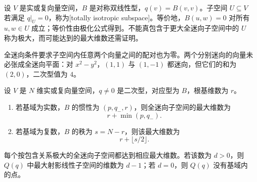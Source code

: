 \begin{definition}
	\label{g1:def:totally-isotropic}
	设 \(V\) 是实或复向量空间，\(B\) 是对称双线性型，\(q(v)=B(v,v)\)。子空间 \(U\subseteq V\) 若满足 \(q|_U=0\)，称为[totally isotropic subspace]。等价地，\(B(u,w)=0\) 对所有 \(u,w\in U\) 成立；等价性由极化公式得到。不能真包含于更大全迷向子空间中的 \(U\) 称为极大，而可能达到的最大维数还需证明。
\end{definition}

全迷向条件要求子空间内任意两个向量之间的配对也为零。两个分别迷向的向量未必张成全迷向平面：对 \(x^2-y^2\)，\((1,1)\) 与 \((1,-1)\) 都迷向，但它们的和为 \((2,0)\)，二次型值为 \(4\)。

\begin{theorem}
	\label{g1:thm:quadric-linear-dimension}
	设 \(V\) 是 \(N\) 维实或复向量空间，\(q\ne0\) 是二次型，对应型为 \(B\)，根基维数为 \(r\)。
	\begin{enumerate}
		\item 若基域为实数，\(B\) 的惯性为 \((p,q_-,r)\)，则全迷向子空间的最大维数为
		\[
			r+\min(p,q_-).
		\]
		\item 若基域为复数，\(B\) 的秩为 \(s=N-r\)，则该最大维数为
		\[
			r+\lfloor s/2\rfloor.
		\]
	\end{enumerate}
	每个按包含关系极大的全迷向子空间都达到相应最大维数。若该数为 \(d>0\)，则 \(Q(q)\) 中最大射影线性子空间的维数为 \(d-1\)；若 \(d=0\)，则 \(Q(q)\) 没有基域内的点。
\end{theorem}

